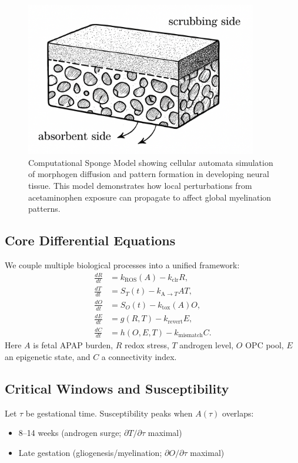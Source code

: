\documentclass[12pt]{article}
\begin{document}
\begin{figure}[h]
\centering
\includegraphics[width=0.9\textwidth]{../assets/SpongeModel.png}
\caption{Computational Sponge Model showing cellular automata simulation of morphogen diffusion and pattern formation in developing neural tissue. This model demonstrates how local perturbations from acetaminophen exposure can propagate to affect global myelination patterns.}
\label{fig:sponge-model}
\end{figure}

\subsection{Core Differential Equations}
We couple multiple biological processes into a unified framework:
\begin{align}
\frac{dR}{dt} &= k_{\mathrm{ROS}}(A) - k_{\mathrm{clr}} R, \\
\frac{dT}{dt} &= S_{T}(t) - k_{\mathrm{A}\to T} A T, \\
\frac{dO}{dt} &= S_{O}(t) - k_{\mathrm{tox}}(A) O, \\
\frac{dE}{dt} &= g(R,T) - k_{\mathrm{revert}} E, \\
\frac{dC}{dt} &= h(O,E,T) - k_{\mathrm{mismatch}} C.
\end{align}
Here $A$ is fetal APAP burden, $R$ redox stress, $T$ androgen level,
$O$ OPC pool, $E$ an epigenetic state, and $C$ a connectivity index.




\subsection{Critical Windows and Susceptibility}
Let $\tau$ be gestational time. Susceptibility peaks when $A(\tau)$ overlaps:
\begin{itemize}
  \item 8--14 weeks (androgen surge; $\partial T/\partial \tau$ maximal)
  \item Late gestation (gliogenesis/myelination; $\partial O/\partial \tau$ maximal)
\end{itemize}
\end{document}

